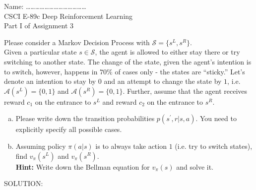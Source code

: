 \documentclass[12pt]{letter}
\begin{document}
\begin{flushleft}
{\sc Name: \ldots\ldots\ldots\ldots\ldots\ldots\ldots\ldots\ldots\ldots\ldots\ldots\ldots}\\
CSCI E-89c Deep Reinforcement Learning\\
Part I of Assignment 3\\
\end{flushleft}

Please consider a Markov Decision Process with  $\mathcal{S}=\{s^{L},s^{R}\}$.\medskip\\
Given a particular state $s\in \mathcal{S}$, the agent is allowed to either stay there or try switching to another state. The change of the state, given the agent's intention is to switch, however, happens in $70\%$ of cases only - the states are ``sticky.'' Let's denote an intention to stay by $0$ and an attempt to change the state by $1$, i.e. $\mathcal{A}(s^L)=\{0,1\}$ and $\mathcal{A}(s^R)=\{0,1 \}$. Further, assume that the agent receives reward $c_1$ on the entrance to $s^{L}$ and reward $c_2$ on the entrance to $s^{R}$. 

\begin{enumerate}[(a)]
\item Please write down the transition probabilities $p(s^\prime, r|s,a)$. You need to explicitly specify all possible cases.
\item Assuming policy $\pi(a|s)$ is to always take action $1$ (i.e. try to switch states), find $v_\pi(s^L)$ and $v_\pi(s^R)$.\\
{\bf Hint:} Write down the Bellman equation for $v_\pi(s)$ and solve it.
\end{enumerate}
SOLUTION:
\end{document}
